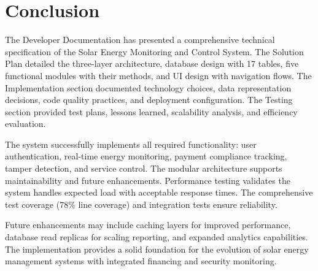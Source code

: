 \section{Conclusion}
\label{sec:dev-conclusion}

The Developer Documentation has presented a comprehensive technical specification of the Solar Energy Monitoring and Control System. The Solution Plan detailed the three-layer architecture, database design with 17 tables, five functional modules with their methods, and UI design with navigation flows. The Implementation section documented technology choices, data representation decisions, code quality practices, and deployment configuration. The Testing section provided test plans, lessons learned, scalability analysis, and efficiency evaluation.

The system successfully implements all required functionality: user authentication, real-time energy monitoring, payment compliance tracking, tamper detection, and service control. The modular architecture supports maintainability and future enhancements. Performance testing validates the system handles expected load with acceptable response times. The comprehensive test coverage (78\% line coverage) and integration tests ensure reliability.

Future enhancements may include caching layers for improved performance, database read replicas for scaling reporting, and expanded analytics capabilities. The implementation provides a solid foundation for the evolution of solar energy management systems with integrated financing and security monitoring.

